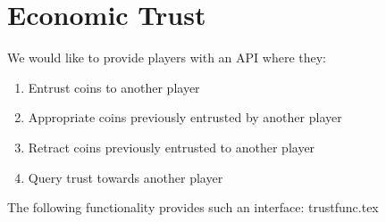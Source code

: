 \section*{Economic Trust}
  We would like to provide players with an API where they:
  \begin{enumerate}
    \item Entrust coins to another player
    \item Appropriate coins previously entrusted by another player
    \item Retract coins previously entrusted to another player
    \item Query trust towards another player
  \end{enumerate}
  The following functionality provides such an interface:
  {trustfunc.tex}
